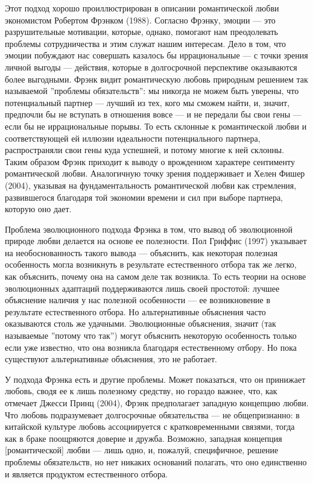 \documentclass[11pt]{book}
\begin{document}
Этот подход хорошо проиллюстрирован в описании романтической любви экономистом Робертом Фрэнком (1988). Согласно Фрэнку, эмоции --- это разрушительные мотивации, которые, однако, помогают нам преодолевать проблемы сотрудничества и этим служат нашим интересам. Дело в том, что эмоции побуждают нас совершать казалось бы иррациональные --- с точки зрения личной выгоды --- действия, которые в долгосрочной перспективе оказываются более выгодными. Фрэнк видит романтическую любовь природным решением так называемой ''проблемы обязательств'': мы никогда не можем быть уверены, что потенциальный партнер --- лучший из тех, кого мы сможем найти, и, значит, предпочли бы не вступать в отношения вовсе --- и не передали бы свои гены --- если бы не иррациональные порывы. То есть склонные к романтической любви и соответствующей ей иллюзии идеальности потенциального партнера, распространяли свои гены куда успешней, и потому многие к ней склонны. Таким образом Фрэнк приходит к выводу о врожденном характере сентименту романтической любви. Аналогичную точку зрения поддерживает и Хелен Фишер (2004), указывая на фундаментальность романтической любви как стремления, развившегося благодаря той экономии времени и сил при выборе партнера, которую оно дает.

Проблема эволюционного подхода Фрэнка в том, что вывод об эволюционной природе любви делается на основе ее полезности. Пол Гриффис (1997) указывает на необоснованность такого вывода --- объяснить, как некоторая полезная особенность могла возникнуть в результате естественного отбора так же легко, как объяснить, почему она на самом деле так возникла. То есть теории на основе эволюционных адаптаций поддерживаются лишь своей простотой: лучшее объяснение наличия у нас полезной особенности --- ее возникновение в результате естественного отбора. Но альтернативные объяснения часто оказываются столь же удачными. Эволюционные объяснения, значит (так называемые ''потому что так'') могут объяснить некоторую особенность только если уже известно, что она возникла благодаря естественному отбору. Но пока существуют альтернативные объяснения, это не работает.

У подхода Фрэнка есть и другие проблемы. Может показаться, что он принижает любовь, сводя ее к лишь полезному средству, но гораздо важнее, что, как отмечает Джесси Принц (2004), Фрэнк предполагает западную концепцию любви. Что любовь подразумевает долгосрочные обязательства --- не общепризнанно: в китайской культуре любовь ассоциируется с кратковременными связями, тогда как в браке поощряются доверие и дружба. Возможно, западная концепция [романтической] любви --- лишь одно, и, пожалуй, специфичное, решение проблемы обязательств, но нет никаких оснований полагать, что оно единственно и является продуктом естественного отбора.
\end{document}
